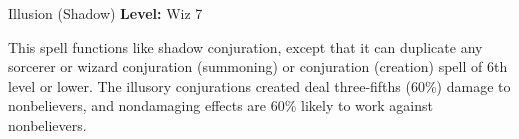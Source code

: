 {Illusion (Shadow)}
{
	\textbf{Level:}
	Wiz 7\\
}
{
	This spell functions like shadow conjuration, except that it can duplicate any sorcerer or wizard conjuration (summoning) or conjuration (creation) spell of 6th level or lower. The illusory conjurations created deal three-fifths (60\%) damage to nonbelievers, and nondamaging effects are 60\% likely to work against nonbelievers.

}
